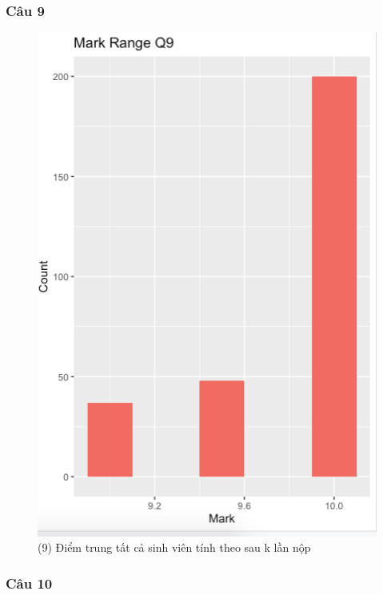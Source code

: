 \documentclass[a4paper]{article}
\theoremstyle{definition}
\begin{document}
\subsubsection{Câu 9}
\begin{figure}[!ht]
    \centering
    \includegraphics[scale=0.4]{Pics/q9-plot1.png}
    \caption{(9) Điểm trung tất cả sinh viên tính theo sau k lần nộp}
    \label{fig:my_label}
\end{figure}
\subsubsection{Câu 10}
\newpage
\end{document}
